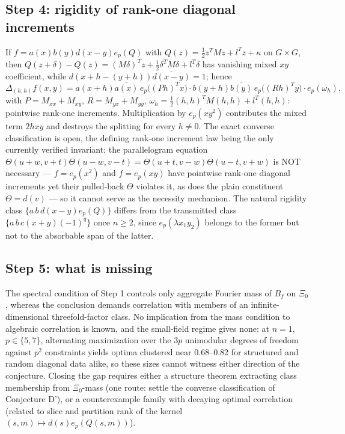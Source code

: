 \documentclass[11pt]{article}
\begin{document}
\subsection{Step 4: rigidity of rank-one diagonal increments}
If $f=a(x)b(y)d(x-y)e_p(Q)$ with $Q(z)=\tfrac12 z^{T}Mz+l^{T}z+\kappa$ on
$G\times G$, then $Q(z+\delta)-Q(z)=(M\delta)^{T}z+\tfrac12\delta^{T}M\delta
+l^{T}\delta$ has vanishing mixed $xy$ coefficient, while
$d(x+h-(y+h))\overline{d(x-y)}=1$; hence
\[
\Delta_{(h,h)}f(x,y)
=a(x+h)\overline{a(x)}\,e_p\bigl((Ph)^{T}x\bigr)\cdot
 b(y+h)\overline{b(y)}\,e_p\bigl((Rh)^{T}y\bigr)\cdot e_p(\omega_h),
\]
with $P=M_{xx}+M_{xy}$, $R=M_{yx}+M_{yy}$,
$\omega_h=\tfrac12(h,h)^TM(h,h)+l^T(h,h)$: pointwise rank-one increments.
Multiplication by $e_p(xy^2)$ contributes the mixed term $2hxy$ and destroys
the splitting for every $h\ne0$. The exact converse classification is open,
the defining rank-one increment law being the only currently verified
invariant; the parallelogram equation
$\Theta(u+w,v+t)\Theta(u-w,v-t)=\Theta(u+t,v-w)\Theta(u-t,v+w)$ is NOT
necessary — $f=e_p(x^2)$ and $f=e_p(xy)$ have pointwise rank-one diagonal
increments yet their pulled-back $\Theta$ violates it, as does the plain
constituent $\Theta=d(v)$ — so it cannot serve as the necessity mechanism.
The natural rigidity class $\{a\,b\,d(x-y)e_p(Q)\}$ differs from the
transmitted class $\{a\,b\,c(x+y)(-1)^q\}$ once $n\ge2$, since
$e_p(\lambda x_1y_2)$ belongs to the former but not to the absorbable span of
the latter.

\subsection{Step 5: what is missing}
The spectral condition of Step 1 controls only aggregate Fourier mass of
$B_f$ on $\Xi_0$, whereas the conclusion demands correlation with members of
an infinite-dimensional threefold-factor class. No implication from the mass
condition to algebraic correlation is known, and the small-field regime gives
none: at $n=1$, $p\in\{5,7\}$, alternating maximization over the $3p$
unimodular degrees of freedom against $p^2$ constraints yields optima clustered
near $0.68$--$0.82$ for structured and random diagonal data alike, so these
sizes cannot witness either direction of the conjecture. Closing the gap
requires either a structure theorem extracting class membership from
$\Xi_0$-mass (one route: settle the converse classification of Conjecture
D'), or a
counterexample family with decaying optimal correlation (related to slice and
partition rank of the kernel $(s,m)\mapsto d(s)e_p(Q(s,m))$).
\end{document}
